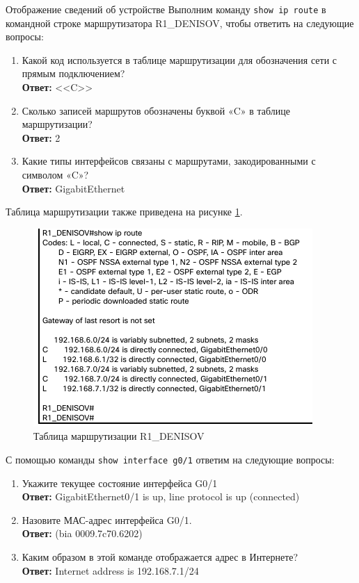 \documentclass[a4paper,14pt]{extarticle}
\begin{document}
\begin{mypart}{Отображение сведений об устройстве}
Выполним команду \texttt{show ip route} в командной строке маршрутизатора R1\_DENISOV, чтобы ответить на следующие вопросы:
\begin{enumerate}
	\item Какой код используется в таблице маршрутизации для обозначения сети с прямым подключением?
		\\\textbf{Ответ:} <<C>>
	\item Сколько записей маршрутов обозначены буквой «C» в таблице маршрутизации?
		\\\textbf{Ответ:} 2
	\item Какие типы интерфейсов связаны с маршрутами, закодированными с символом «C»?
		\\\textbf{Ответ:} GigabitEthernet
\end{enumerate}
Таблица маршрутизации также приведена на рисунке \ref{fig:pract5-ip-route}.
\begin{figure}[h!]
	\centering
	\includegraphics[width=0.4\linewidth]{images/pract5-ip-route}
	\caption{Таблица маршрутизации R1\_DENISOV}
	\label{fig:pract5-ip-route}
\end{figure}


С помощью команды \texttt{show interface g0/1} ответим на следующие вопросы:
\begin{enumerate}
	\item Укажите текущее состояние интерфейса G0/1
		\\\textbf{Ответ:} GigabitEthernet0/1 is up, line protocol is up (connected)
	\item Назовите МАС-адрес интерфейса G0/1.
		\\\textbf{Ответ:} (bia 0009.7c70.6202)
	\item Каким образом в этой команде отображается адрес в Интернете?
		\\\textbf{Ответ:} Internet address is 192.168.7.1/24
\end{enumerate}



\end{mypart}
\end{document}
